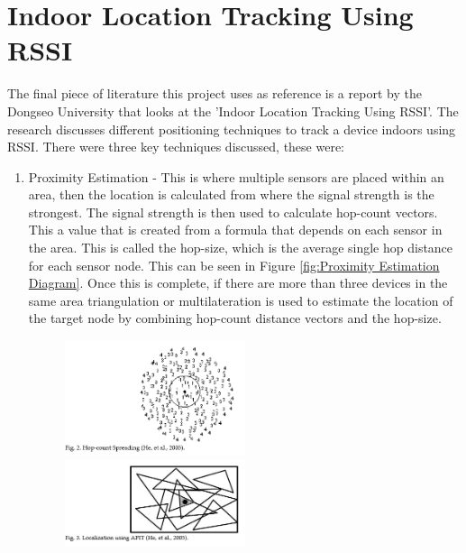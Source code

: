 \documentclass{report}
\begin{document}
\section{Indoor Location Tracking Using RSSI}
The final piece of literature this project uses as reference is a report by the Dongseo University that looks at the 'Indoor Location Tracking Using RSSI'\cite{IndoorTrackingRSSI}. The research discusses different positioning techniques to track a device indoors using RSSI. There were three key techniques discussed, these were:
\begin{enumerate}
    \item Proximity Estimation - This is where multiple sensors are placed within an area, then the location is calculated from where the signal strength is the strongest. The signal strength is then used to calculate hop-count vectors. This a value that is created from a formula that depends on each sensor in the area. This is called the hop-size, which is the average single hop distance for each sensor node. This can be seen in Figure \ref{fig:Proximity Estimation Diagram}. Once this is complete, if there are more than three devices in the same area triangulation or multilateration is used to estimate the location of the target node by combining hop-count distance vectors and the hop-size.
    \begin{figure}[h!]
    \centering
    \includegraphics[width=200]{Proximity_estimation1.PNG} 
    \includegraphics[width=200]{Proximity_estimation2.PNG}

\end{figure}
\end{enumerate}
\end{document}

